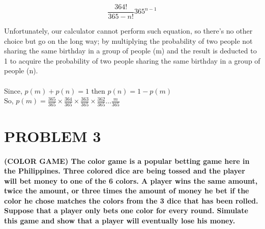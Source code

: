 \documentclass[12pt,letterpaper]{article}
\begin{document}
\begin{enumerate}[label=\Alph*]
	\begin{equation*}
	\frac{364!}{365-n!}365^{n-1}
	\end{equation*}

Unfortunately, our calculator cannot perform such equation, so there’s no other choice but go on the long way; by multiplying the probability of two people not sharing the same birthday in a group of people (m) and the result is deducted to 1 to acquire the probability of two people sharing the same birthday in a group of people (n). \\\\
Since, $p(m) + p(n) =1$ then $p(n)= 1 -p(m)$\\
So, $p(m)=\frac{365}{365}\times\frac{364}{365}\times\frac{363}{365}\times\frac{362}{365}\ldots\frac{m}{365}$

\end{enumerate}

\pagebreak



\section*{PROBLEM 3}

\paragraph{\textbf{(COLOR GAME) } The color game is a popular betting game here in the Philippines. Three colored dice are being tossed and the player will bet money to one of the 6 colors. A player wins the same amount, twice the amount, or three times the amount of money he bet if the color he chose matches the colors from the 3 dice that has been rolled. Suppose that a player only bets one color for every round. Simulate this game and show that a player will eventually lose his money.}
\end{document}
